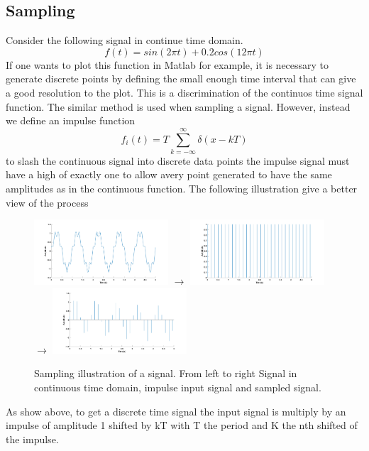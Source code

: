 \documentclass[12pt,letterpaper]{article}
\begin{document}
\subsection*{Sampling}
Consider the following signal in continue time domain. 
\begin{equation}
    f(t)=sin(2\pi t) +0.2cos(12\pi t)
\end{equation}
If one wants to plot this function in Matlab for example, it is necessary to generate discrete points
by defining the small enough time interval that can give a good resolution to the plot. This
is a discrimination of the continuos time signal function. The similar method is used when sampling a signal.
However, instead we define an impulse function 
\begin{equation}
    f_i(t)=T\sum_{k=-\infty}^{\infty} \delta(x-kT)
\end{equation}
to slash the continuous signal into discrete data points
the impulse signal must have a high of exactly one to allow avery point generated to have the 
same amplitudes as in the continuous function. The following illustration give a better view of the 
process
\begin{figure}[h]
    \centering
        \includegraphics[width=5cm]{signal.jpg} \(\rightarrow\)
        \includegraphics[width=5cm]{inpulse.jpg} \(\rightarrow\)
        \includegraphics[width=5cm]{sampling_lias.jpg}
        \caption{Sampling illustration of a signal. From left to right Signal in continuous time domain,
        impulse input signal and sampled signal.}
\end{figure}
As show above, to get a discrete time signal  the input signal is multiply by an impulse of amplitude
1 shifted by kT with T the period and K the nth shifted of the impulse.\\
\end{document}
